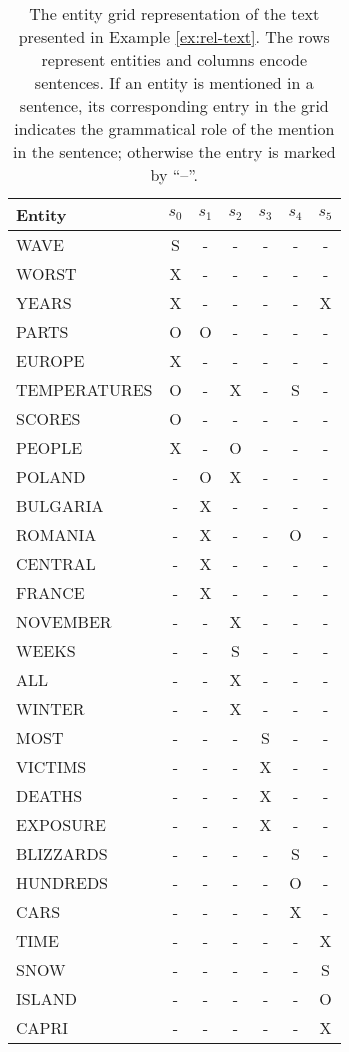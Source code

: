 \begin{table}[!ht]	
	\begin{center}
		\begin{tabular}{lcccccc}
			\toprule
			Entity  		& $s_0$ & $s_1$ & $s_2$ & $s_3$ & $s_4$ & $s_5$ 
			\\
			\midrule
			WAVE 			& S & - & - & - & - & - \\
			WORST 			& X & - & - & - & - & - \\
			YEARS 			& X & - & - & - & - & X \\
			PARTS 			& O & O & - & - & - & - \\
			EUROPE  		& X & - & - & - & - & - \\
			TEMPERATURES  	& O & - & X & - & S & - \\
			SCORES  		& O & - & - & - & - & - \\
			PEOPLE  		& X & - & O & - & - & - \\
			POLAND 			& - & O & X & - & - & - \\
			BULGARIA  		& - & X & - & - & - & - \\
			ROMANIA  		& - & X & - & - & O & - \\
			CENTRAL  		& - & X & - & - & - & - \\
			FRANCE  		& - & X & - & - & - & - \\
			NOVEMBER  		& - & - & X & - & - & - \\
			WEEKS 			& - & - & S & - & - & - \\
			ALL 			& - & - & X & - & - & - \\
			WINTER  		& - & - & X & - & - & - \\
			MOST 			& - & - & - & S & - & - \\
			VICTIMS  		& - & - & - & X & - & - \\
			DEATHS 			& - & - & - & X & - & - \\
			EXPOSURE  		& - & - & - & X & - & - \\
			BLIZZARDS  		& - & - & - & - & S & - \\
			HUNDREDS  		& - & - & - & - & O & - \\
			CARS  			& - & - & - & - & X & - \\
			TIME  			& - & - & - & - & - & X \\
			SNOW  			& - & - & - & - & - & S \\
			ISLAND 			& - & - & - & - & - & O \\
			CAPRI 			& - & - & - & - & - & X \\
			\bottomrule
		\end{tabular}
		\caption{
		The entity grid representation of the text presented in Example \ref{ex:rel-text}. The rows represent entities and columns encode sentences. 
        If an entity is mentioned in a sentence, its corresponding entry in the grid indicates the grammatical role of the mention in the sentence; otherwise the entry is marked by ``--''.
		} 
		\label{tab:rel-egrid}
	\end{center}
\end{table}

